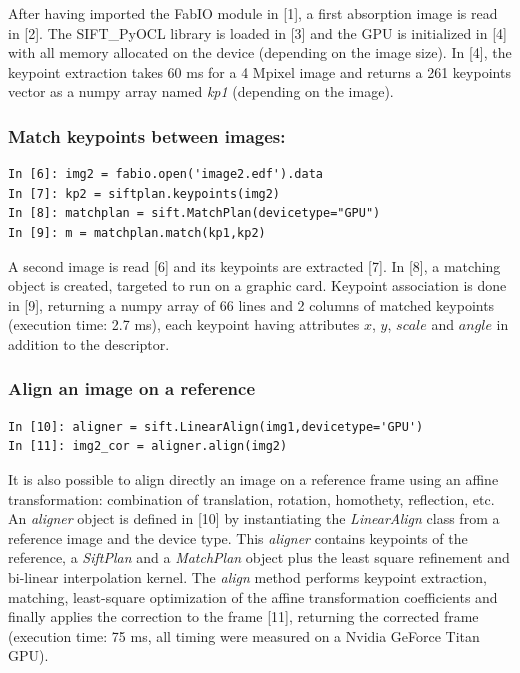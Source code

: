 \documentclass[preprint]{iucr}
\begin{document}
After having imported the FabIO \cite{fabio} module in [1], a first
absorption image is read in [2]. The SIFT\_PyOCL library is loaded in [3] and the
GPU is initialized in [4] with all memory allocated on the device (depending on
the image size).
In [4], the keypoint extraction takes 60 ms for a
4 Mpixel image and returns a 261 keypoints vector as a numpy array named
\emph{kp1} (depending on the image).

\subsubsection{Match keypoints between images:}
\begin{verbatim}
In [6]: img2 = fabio.open('image2.edf').data
In [7]: kp2 = siftplan.keypoints(img2)
In [8]: matchplan = sift.MatchPlan(devicetype="GPU")
In [9]: m = matchplan.match(kp1,kp2)
\end{verbatim}
A second image is read [6] and its keypoints are extracted [7].
In [8], a matching object is created, targeted to run on a graphic card.  
Keypoint association is done in [9], returning a numpy array of 66 lines and 2
columns of matched keypoints (execution time: 2.7 ms), each keypoint having
attributes $x$, $y$, $scale$ and $angle$ in addition to the descriptor.

\subsubsection{Align an image on a reference}
\begin{verbatim}
In [10]: aligner = sift.LinearAlign(img1,devicetype='GPU')
In [11]: img2_cor = aligner.align(img2)
\end{verbatim}
It is also possible to align directly an image on a reference frame using an
affine transformation: combination of translation, rotation, homothety,
reflection, etc.
An \emph{aligner} object is defined in [10] by instantiating the 
\emph{LinearAlign} class from a reference image and the device type. 
This \emph{aligner} contains keypoints of the
reference, a \emph{SiftPlan} and a \emph{MatchPlan} object plus the least square
refinement and bi-linear interpolation kernel.
The \emph{align} method performs keypoint extraction, matching, least-square
optimization of the affine transformation coefficients and finally applies the
correction to the frame [11], returning the corrected frame (execution time:
75 ms, all timing were measured on a Nvidia GeForce Titan GPU). 
\end{document}
